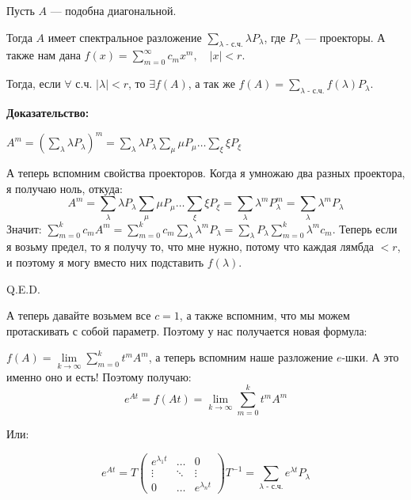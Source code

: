 
Пусть $A$ --- подобна диагональной.

Тогда $A$ имеет спектральное разложение $\sum\limits_{\lambda \text{ - с.ч.}}\lambda P_\lambda$, где $P_{\lambda}$ --- проекторы. А также нам дана $f(x) = \sum\limits_{m=0}^\infty c_m x^m, \quad |x|<r$.

Тогда, если $\forall$ с.ч. $|\lambda|< r$, то $\exists f(A)$, а так же $f(A) = \sum\limits_{\lambda \text{ - с.ч.}}f(\lambda)P_\lambda$.

\textbf{Доказательство:}

$A^m = (\sum\limits_{\lambda }\lambda P_{\lambda})^m = \sum\limits_{\lambda}\lambda P_{\lambda}\sum\limits_{\mu}\mu P_{\mu} \ldots \sum\limits_{\xi}\xi P_{\xi}$

А теперь вспомним свойства проекторов. Когда я умножаю два разных проектора, я получаю ноль, откуда:
$$A^m = \sum\limits_{\lambda}\lambda P_{\lambda}\sum\limits_{\mu}\mu P_{\mu} \ldots \sum\limits_{\xi}\xi P_{\xi} = \sum\limits_{\lambda}\lambda^m P_{\lambda}^m = \sum\limits_{\lambda}\lambda^m P_\lambda$$
Значит: $\sum\limits_{m=0}^k c_m A^m =\sum\limits_{m=0}^k c_m  \sum\limits_{\lambda}\lambda^m P_\lambda =  \sum\limits_{\lambda}P_{\lambda} \sum\limits_{m=0}^k\lambda^m c_m $.  Теперь если я возьму предел, то я получу то, что мне нужно, потому что каждая лямбда $<r$, и поэтому я могу вместо них подставить $f(\lambda)$.

  \hfill Q.E.D.
\\


А теперь давайте возьмем все $c=1$,  а также вспомним, что мы можем протаскивать с собой параметр. Поэтому у нас получается новая формула:

$f(A) =\lim\limits_{k\rightarrow\infty}\sum\limits_{m=0}^k    t^mA^m$, а теперь вспомним наше разложение $e$-шки. А это именно оно и есть! Поэтому получаю:
$$e^{At}=f(At) =\lim\limits_{k\rightarrow\infty}\sum\limits_{m=0}^k  t^mA^m$$

Или:

$$e^{At} = T \begin{pmatrix}
    e^{\lambda_1t} & \ldots & 0 \\
    \vdots &\ddots& \vdots\\
    0 & \ldots & e^{\lambda_nt}
\end{pmatrix} T^{-1} = \sum\limits_{\text{$\lambda$ - с.ч.}} e^{\lambda t}P_{\lambda}$$


